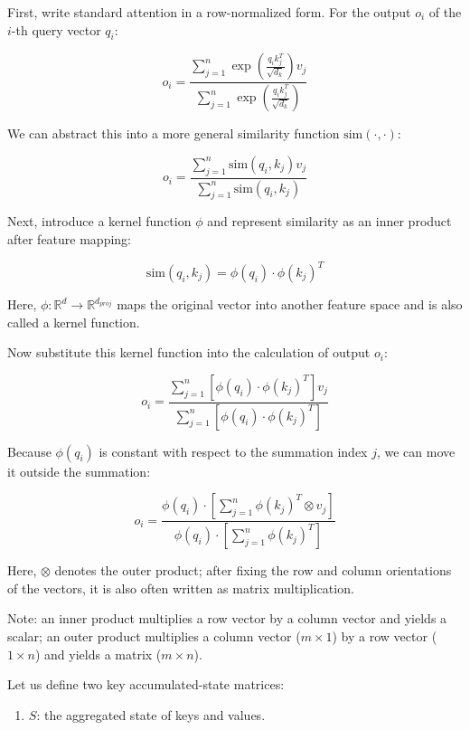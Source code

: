 First, write standard attention in a row-normalized form. For the output \(o_i\) of the \(i\)-th query vector \(q_i\):

\[
o_i =
\frac{
\sum_{j=1}^{n} \exp\left(\frac{q_i k_j^T}{\sqrt{d_k}}\right)v_j
}{
\sum_{j=1}^{n} \exp\left(\frac{q_i k_j^T}{\sqrt{d_k}}\right)
}
\]

We can abstract this into a more general similarity function \(\mathrm{sim}(\cdot,\cdot)\):

\[
o_i =
\frac{
\sum_{j=1}^{n} \mathrm{sim}(q_i,k_j)v_j
}{
\sum_{j=1}^{n} \mathrm{sim}(q_i,k_j)
}
\]

Next, introduce a kernel function \(\phi\) and represent similarity as an inner product after feature mapping:

\[
\mathrm{sim}(q_i,k_j) = \phi(q_i)\cdot\phi(k_j)^T
\]

Here, \(\phi:\mathbb{R}^{d}\rightarrow\mathbb{R}^{d_{proj}}\) maps the original vector into another feature space and is also called a kernel function.

Now substitute this kernel function into the calculation of output \(o_i\):

\[
o_i =
\frac{
\sum_{j=1}^{n}[\phi(q_i)\cdot\phi(k_j)^T]v_j
}{
\sum_{j=1}^{n}[\phi(q_i)\cdot\phi(k_j)^T]
}
\]

Because \(\phi(q_i)\) is constant with respect to the summation index \(j\), we can move it outside the summation:

\[
o_i =
\frac{
\phi(q_i)\cdot\left[\sum_{j=1}^{n}\phi(k_j)^T \otimes v_j\right]
}{
\phi(q_i)\cdot\left[\sum_{j=1}^{n}\phi(k_j)^T\right]
}
\]

Here, \(\otimes\) denotes the outer product; after fixing the row and column orientations of the vectors, it is also often written as matrix multiplication.

Note: an inner product multiplies a row vector by a column vector and yields a scalar; an outer product multiplies a column vector (\(m \times 1\)) by a row vector (\(1 \times n\)) and yields a matrix (\(m \times n\)).

Let us define two key accumulated-state matrices:

\begin{enumerate}
\def\labelenumi{\arabic{enumi}.}
\tightlist
\item
  \(S\): the aggregated state of keys and values.
\end{enumerate}

